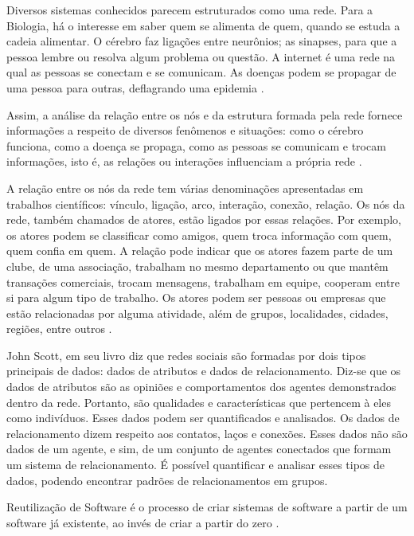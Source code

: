 Diversos sistemas conhecidos parecem estruturados como uma rede. Para a Biologia, há o interesse em saber quem se alimenta de quem, quando se estuda a cadeia alimentar. O cérebro faz ligações entre neurônios; as sinapses, para que a pessoa lembre ou resolva algum problema ou questão. A internet é uma rede na qual as pessoas se conectam e se comunicam. As doenças podem se propagar de uma pessoa para outras, deflagrando uma epidemia \cite{Goular:2014}.

Assim, a análise da relação entre os nós e da estrutura formada pela rede fornece informações a respeito de diversos fenômenos e situações: como o cérebro funciona, como a doença se propaga, como as pessoas se comunicam e trocam informações, isto é, as relações ou interações influenciam a própria rede \cite{Goular:2014}.

A relação entre os nós da rede tem várias denominações apresentadas em trabalhos científicos: vínculo, ligação, arco, interação, conexão, relação. Os nós da rede, também chamados de atores, estão ligados por essas relações. Por exemplo, os atores podem se classificar como amigos, quem troca informação com quem, quem confia em quem. A relação pode indicar que os atores fazem parte de um clube, de uma associação, trabalham no mesmo departamento ou que mantêm transações comerciais, trocam mensagens, trabalham em equipe, cooperam entre si para algum tipo de trabalho. Os atores podem ser pessoas ou empresas que estão relacionadas por alguma atividade, além de grupos, localidades, cidades, regiões, entre outros \cite{Hanneman:Riddle:2005}.

John Scott, em seu livro \cite{Scott:Carrington:2011} diz que redes sociais são formadas por dois tipos principais de dados: dados de atributos e dados de relacionamento. Diz-se que os dados de atributos são as opiniões e comportamentos dos agentes demonstrados dentro da rede. Portanto, são qualidades e características que pertencem à eles como indivíduos. Esses dados podem ser quantificados e analisados. Os dados de relacionamento dizem respeito aos contatos, laços e conexões. Esses dados não são dados de um agente, e sim, de um conjunto de agentes conectados que formam um sistema de relacionamento. É possível quantificar e analisar esses tipos de dados, podendo encontrar padrões de relacionamentos em grupos.

Reutilização de Software é o processo de criar sistemas de software a partir de um software já existente, ao invés de criar a partir do zero \cite{Krueger:1992}.

